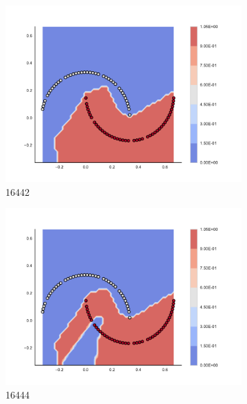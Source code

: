\begin{figure}[h]
\begin{subfigure}[b]{0.09\textwidth}
    \includegraphics[clip, trim=2.35cm 1.75cm 4.5cm 0cm,width=\textwidth]{img/convergence/16442.pdf}
    \caption{16442}
    \label{fig:convergence_16442}
\end{subfigure}
%
\begin{subfigure}[b]{0.09\textwidth}
    \includegraphics[clip, trim=2.35cm 1.75cm 4.5cm 0cm,width=\textwidth]{img/convergence/16444.pdf}
    \caption{16444}
    \label{fig:convergence_16444}
\end{subfigure}
%
\begin{subfigure}[b]{0.09\textwidth}

\end{subfigure}
\end{figure}
